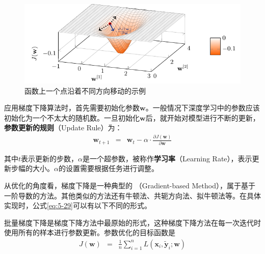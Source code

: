 \begin{figure}[htp]
\centering
\includegraphics{./Chapter5/Figures/fig-gradient-descent.pdf}
\caption{函数上一个点沿着不同方向移动的示例}
\label{fig:5-43}
\end{figure}

\parinterval 应用梯度下降算法时，首先需要初始化参数$\mathbf{w}$。一般情况下深度学习中的参数应该初始化为一个不太大的随机数。一旦初始化$\mathbf{w}$后，就开始对模型进行不断的更新，{\small\sffamily\bfseries{参数更新的规则}}（Update Rule）为：
\begin{eqnarray}
\mathbf w_{t+1}&=&\mathbf w_{t}-\alpha \cdot \frac{\partial J(\mathbf w)}{\partial \mathbf w}
\label{eq:5-29}
\end{eqnarray}

\noindent 其中$t $表示更新的步数，$ \alpha $是一个超参数，被称作{\small\sffamily\bfseries{学习率}}（Learning Rate），表示更新步幅的大小。$ \alpha $的设置需要根据任务进行调整。

\parinterval 从优化的角度看，梯度下降是一种典型的 {\small{}}（Gradient-based Method），属于基于一阶导数的方法。其他类似的方法还有牛顿法、共轭方向法、拟牛顿法等。在具体实现时，公式\ref{eq:5-29}可以有以下不同的形式。\\

%

\vspace{0.5em}
\vspace{0.5em}

\parinterval 批量梯度下降是梯度下降方法中最原始的形式，这种梯度下降方法在每一次迭代时使用所有的样本进行参数更新。参数优化的目标函数是
\begin{eqnarray}
J(\mathbf w)&=&\frac{1}{n}\sum_{i=1}^{n}{L(\mathbf x_i,\mathbf {\widetilde y}_i;\mathbf w)}
\label{eq:5-30}
\end{eqnarray}

